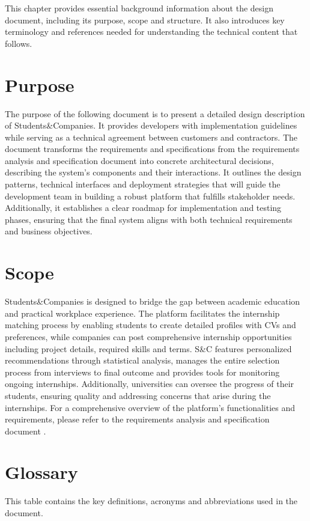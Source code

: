 This chapter provides essential background information about the design document, including its purpose, scope and structure.
It also introduces key terminology and references needed for understanding the technical content that follows.

\section{Purpose}
The purpose of the following document is to present a detailed design description of Students\&Companies.
It provides developers with implementation guidelines while serving as a technical agreement between customers and contractors.
The document transforms the requirements and specifications from the requirements analysis and specification document \cite{carraracurrodossi2024} into concrete architectural decisions, describing the system's components and their interactions.
It outlines the design patterns, technical interfaces and deployment strategies that will guide the development team in building a robust platform that fulfills stakeholder needs.
Additionally, it establishes a clear roadmap for implementation and testing phases, ensuring that the final system aligns with both technical requirements and business objectives.

\section{Scope}
Students\&Companies is designed to bridge the gap between academic education and practical workplace experience.
The platform facilitates the internship matching process by enabling students to create detailed profiles with CVs and preferences, while companies can post comprehensive internship opportunities including project details, required skills and terms.
S\&C features personalized recommendations through statistical analysis, manages the entire selection process from interviews to final outcome and provides tools for monitoring ongoing internships.
Additionally, universities can oversee the progress of their students, ensuring quality and addressing concerns that arise during the internships.
For a comprehensive overview of the platform's functionalities and requirements, please refer to the requirements analysis and specification document \cite{carraracurrodossi2024}.

\section{Glossary}
This table contains the key definitions, acronyms and abbreviations used in the document.

